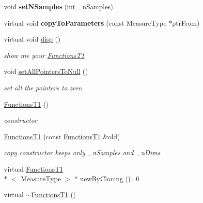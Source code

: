 \begin{DoxyCompactItemize}
\item 
\hypertarget{class_ox_1_1_functions_t1_ac817cab2256c8495bc6979bb1fca2688}{void {\bfseries set\-N\-Samples} (int \-\_\-n\-Samples)}\label{class_ox_1_1_functions_t1_ac817cab2256c8495bc6979bb1fca2688}

\item 
\hypertarget{class_ox_1_1_functions_t1_ad2a24170cd7de14c49be27ac16dc7ac8}{virtual void {\bfseries copy\-To\-Parameters} (const Measure\-Type $\ast$ptr\-From)}\label{class_ox_1_1_functions_t1_ad2a24170cd7de14c49be27ac16dc7ac8}

\item 
\hypertarget{class_ox_1_1_functions_t1_a21708a9d44f261ba53648c2e6fcdd3a5}{virtual void \hyperlink{class_ox_1_1_functions_t1_a21708a9d44f261ba53648c2e6fcdd3a5}{disp} ()}\label{class_ox_1_1_functions_t1_a21708a9d44f261ba53648c2e6fcdd3a5}

\begin{DoxyCompactList}\small\item\em show me your \hyperlink{class_ox_1_1_functions_t1}{Functions\-T1} \end{DoxyCompactList}\item 
\hypertarget{class_ox_1_1_functions_t1_a242f775b52419858f76d7711096ac5dc}{void \hyperlink{class_ox_1_1_functions_t1_a242f775b52419858f76d7711096ac5dc}{set\-All\-Pointers\-To\-Null} ()}\label{class_ox_1_1_functions_t1_a242f775b52419858f76d7711096ac5dc}

\begin{DoxyCompactList}\small\item\em set all the pointers to zero \end{DoxyCompactList}\item 
\hypertarget{class_ox_1_1_functions_t1_a7dae9dc71ec97e9eef1308c9937aaaf0}{\hyperlink{class_ox_1_1_functions_t1_a7dae9dc71ec97e9eef1308c9937aaaf0}{Functions\-T1} ()}\label{class_ox_1_1_functions_t1_a7dae9dc71ec97e9eef1308c9937aaaf0}

\begin{DoxyCompactList}\small\item\em constructor \end{DoxyCompactList}\item 
\hyperlink{class_ox_1_1_functions_t1_a8b14d232e9136a64ea3ae8f7a162daad}{Functions\-T1} (const \hyperlink{class_ox_1_1_functions_t1}{Functions\-T1} \&old)
\begin{DoxyCompactList}\small\item\em copy constructor keeps only \-\_\-n\-Samples and \-\_\-n\-Dims \end{DoxyCompactList}\item 
virtual \hyperlink{class_ox_1_1_functions_t1}{Functions\-T1}\\*
$<$ Measure\-Type $>$ $\ast$ \hyperlink{class_ox_1_1_functions_t1_a2246ea540016c650d5a18100697eacb8}{new\-By\-Cloning} ()=0
\item 
\hypertarget{class_ox_1_1_functions_t1_a900d5602b3dd10fca760a304e41da9b5}{virtual \hyperlink{class_ox_1_1_functions_t1_a900d5602b3dd10fca760a304e41da9b5}{$\sim$\-Functions\-T1} ()}\label{class_ox_1_1_functions_t1_a900d5602b3dd10fca760a304e41da9b5}


\end{DoxyCompactItemize}
